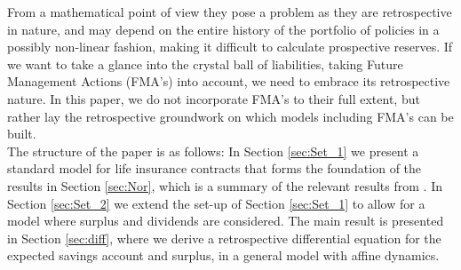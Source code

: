 \documentclass[12pt]{article}
\theoremstyle{my_thm}
\theoremstyle{my_rem}
\begin{document}
From a mathematical point of view they pose a problem as they are retrospective in nature, and may depend on the entire history of the portfolio of policies in a possibly non-linear fashion, making it difficult to calculate prospective reserves. If we want to take a glance into the crystal ball of liabilities, taking Future Management Actions (FMA's) into account, we need to embrace its retrospective nature. In this paper, we do not incorporate FMA's to their full extent, but rather lay the retrospective groundwork on which models including FMA's can be built.
\\[12pt]
The structure of the paper is as follows: In Section \ref{sec:Set_1} we present a standard model for life insurance contracts that forms the foundation of the results in Section \ref{sec:Nor}, which is a summary of the relevant results from \citet{Norberg}. In Section \ref{sec:Set_2} we extend the set-up of Section \ref{sec:Set_1} to allow for a model where surplus and dividends are considered. The main result is presented in Section \ref{sec:diff}, where we derive a retrospective differential equation for the expected savings account and surplus, in a general model with affine dynamics.
\end{document}

